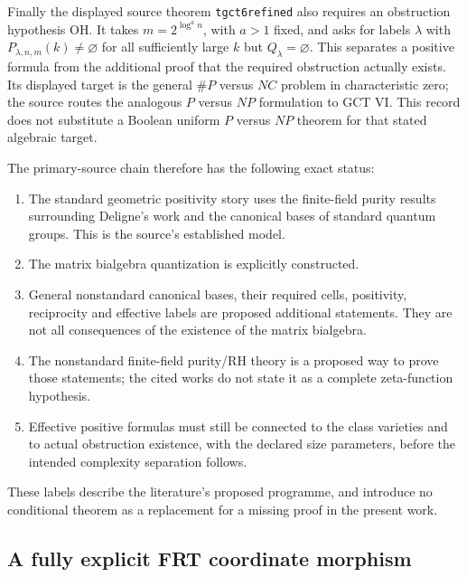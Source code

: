 Finally the displayed source theorem \texttt{tgct6refined} also requires
an obstruction hypothesis OH.  It takes
$m=2^{\log^a n}$, with $a>1$ fixed, and asks for labels $\lambda$ with
$P_{\lambda,n,m}(k)\ne\varnothing$ for all sufficiently large $k$
but $Q_\lambda=\varnothing$.  This separates a positive formula from
the additional proof that the required obstruction actually exists.
Its displayed target is the general $\#P$ versus $NC$ problem in
characteristic zero; the source routes the analogous $P$ versus $NP$
formulation to GCT VI.  This record does not substitute a Boolean uniform
$P$ versus $NP$ theorem for that stated algebraic target.

The primary-source chain therefore has the following exact status:
\begin{enumerate}
\item The standard geometric positivity story uses the finite-field
purity results surrounding Deligne's work and the canonical bases of
standard quantum groups.  This is the source's established model.
\item The matrix bialgebra quantization is explicitly constructed.
\item General nonstandard canonical bases, their required cells,
positivity, reciprocity and effective labels are proposed additional
statements.  They are not all consequences of the existence of the
matrix bialgebra.
\item The nonstandard finite-field purity/RH theory is a proposed way to
prove those statements; the cited works do not state it as a complete
zeta-function hypothesis.
\item Effective positive formulas must still be connected to the class
varieties and to actual obstruction existence, with the declared size
parameters, before the intended complexity separation follows.
\end{enumerate}
These labels describe the literature's proposed programme, and introduce
no conditional theorem as a replacement for a missing proof in the
present work.

\subsection{A fully explicit FRT coordinate morphism}

